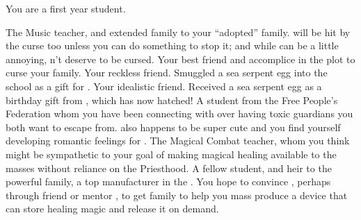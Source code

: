 \documentclass[char]{GL2020}
\begin{document}
\begin{itemz}[Notes]
	\item You are a first year student.
\end{itemz}

\begin{contacts}
	\contact{\cMusic{}} The Music teacher, and extended family to your ``adopted'' family. \cMusic{\They} will be hit  by the curse too unless you can do something to stop it; and while \cMusic{} can be a little annoying, \cMusic{\they} \cMusic{\does}n't deserve to be cursed.
	\contact{\cLibAssist{}} Your best friend and accomplice in the plot to curse your family.
	\contact{\cPirateChild{}} Your reckless friend. Smuggled a sea serpent egg into the school as a gift for \cDisney{}.
	\contact{\cDisney{}} Your idealistic friend. Received a sea serpent egg as a birthday gift from \cPirateChild{}, which has now hatched!
	\contact{\cScholarship{}} A student from the Free People's Federation whom you have been connecting with over having toxic guardians you both want to escape from. \cScholarship{\They} also happens to be super cute and you find yourself developing romantic feelings for \cScholarship{\them}.
	\contact{\cInterpol{}} The Magical Combat teacher, whom you think might be sympathetic to your goal of making magical healing available to the masses without reliance on the Priesthood.
	\contact{\cHeir{}} A fellow student, and heir to the powerful \cHeir{\formal} family, a top manufacturer in the \pTech{}. You hope to convince \cHeir{}, perhaps through \cHeir{\their} friend \cAmbition{} or mentor \cDiplomat{}, to get \cHeir{\their} family to help you mass produce a device that can store healing magic and release it on demand.
\end{contacts}
\end{document}
